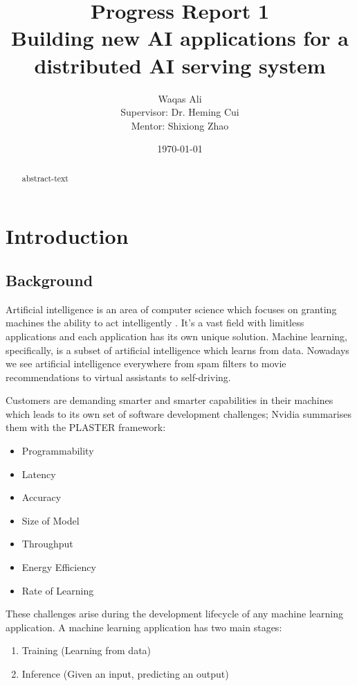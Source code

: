 \documentclass{report}
\title{Progress Report 1 \\ Building new AI applications for a distributed AI serving system}
\author{Waqas Ali\\{\small Supervisor: Dr. Heming Cui}\\{\small Mentor: Shixiong Zhao}}
\date{\today}
\def\frontmatter{%
    \pagenumbering{roman}
    \setcounter{page}{1}
    \renewcommand{\thesection}{\Roman{section}}
}%
\def\mainmatter{%
    \pagenumbering{arabic}
    \setcounter{page}{1}
    \setcounter{section}{0}
    \renewcommand{\thesection}{\arabic{section}}
}%
\begin{document}
\frontmatter
\maketitle

\begin{abstract}
abstract-text
\end{abstract}

\tableofcontents

\listoffigures

\listoftables

\mainmatter

\chapter{Introduction}

\section{Background}
Artificial intelligence is an area of computer science which focuses on granting machines the ability to act intelligently \cite{McCarthy2007}. It's a vast field with limitless applications and each application has its own unique solution. Machine learning, specifically, is a subset of artificial intelligence which learns from data. \cite{Mitchell1997} Nowadays we see artificial intelligence everywhere from spam filters \cite{Androutsopoulos2000} to movie recommendations \cite{lekakos2008hybrid} to virtual assistants to self-driving.

Customers are demanding smarter and smarter capabilities in their machines which leads to its own set of software development challenges; Nvidia summarises them with the PLASTER \cite{Teich2018} framework:
\begin{itemize}
  \item Programmability
  \item Latency
  \item Accuracy
  \item Size of Model
  \item Throughput
  \item Energy Efficiency
  \item Rate of Learning
\end{itemize}

These challenges arise during the development lifecycle of any machine learning application. A machine learning application has two main stages:
\begin{enumerate}
  \item Training (Learning from data)
  \item Inference (Given an input, predicting an output)
\end{enumerate}
\end{document}

